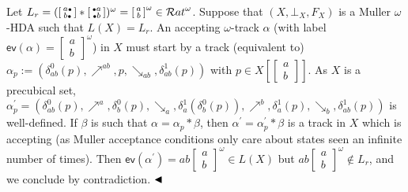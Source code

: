 Let $L_{r}=(\left[\begin{smallmatrix}a\vbox{\hbox{\tiny$\bullet$}}\\
b\vbox{\hbox{\tiny$\bullet$}}\end{smallmatrix}\right]*\left[\begin{smallmatrix}\vbox{\hbox{\tiny$\bullet$}}a\\
\vbox{\hbox{\tiny$\bullet$}}b\end{smallmatrix}\right])^{\omega}=\left[\begin{smallmatrix}a\\
b\end{smallmatrix}\right]^{\omega}\in{\mathcal{R}at}^{\omega}$. Suppose that $(X,\bot_{X},F_{X})$ is a Muller $\omega$-HDA such that $L(X)=L_{r}$. An accepting $\omega$-track $\alpha$ (with label $\mathsf{ev}(\alpha)=\left[\begin{smallmatrix}a\\
b\end{smallmatrix}\right]^{\omega}$) in $X$ must start by a track (equivalent to) $\alpha_{p}:=(\delta^{0}_{ab}(p),\mathrel{\nearrow^{ab}},p,\mathrel{\searrow_{ab}},\delta^{1}_{ab}(p))$ with $p\in X[\left[\begin{smallmatrix}a\\
b\end{smallmatrix}\right]]$. As $X$ is a precubical set, $\alpha^{\prime}_{p}=(\delta^{0}_{ab}(p),\mathrel{\nearrow^{a}},\delta^{0}_{b}(p),\mathrel{\searrow_{a}},\delta^{1}_{a}(\delta^{0}_{b}(p)),\mathrel{\nearrow^{b}},\delta^{1}_{a}(p),\mathrel{\searrow_{b}},\delta^{1}_{ab}(p))$ is well-defined. If $\beta$ is such that $\alpha=\alpha_{p}*\beta$, then $\alpha^{\prime}=\alpha^{\prime}_{p}*\beta$ is a track in $X$ which is accepting (as Muller acceptance conditions only care about states seen an infinite number of times). Then $\mathsf{ev}(\alpha^{\prime})=ab\left[\begin{smallmatrix}a\\
b\end{smallmatrix}\right]^{\omega}\in L(X)$ but $ab\left[\begin{smallmatrix}a\\
b\end{smallmatrix}\right]^{\omega}\not\in L_{r}$, and we conclude by contradiction. $\hfill\blacktriangleleft$\par
 
 
 
